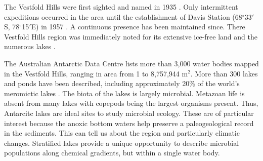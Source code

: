 The Vestfold Hills were first sighted and named in 1935 \cite{Law1959}.
Only intermittent expeditions occurred in the area until the establishment of Davis Station (68$^{\circ}$33$'$S, 78$^{\circ}$15$'$E) in 1957 \cite{Law1959}. 
A continuous presence has been maintained since. %
There Vestfold Hills region was immediately noted for its extensive ice-free land and the numerous lakes \cite{Johnstone1973}.

The Australian Antarctic Data Centre lists more than 3,000 water bodies mapped in the Vestfold Hills, ranging in area from 1 to 8,757,944 m$^2$. %
More than 300 lakes and ponds have been described, including approximately 20\% of the world's meromictic lakes \cite{Gibson1999}. %
The biota of the lakes is largely microbial. 
Metazoan life is absent from many lakes with copepods being the largest organisms present.
Thus, Antarcitc lakes are ideal sites to study microbial ecology.
These are of particular interest because the anoxic bottom waters help preserve a paleogeological record in the sediments.
This can tell us about the region and particularly climatic changes.
Stratified lakes provide a unique opportunity to describe microbial populations along chemical gradients, but within a single water body. 








